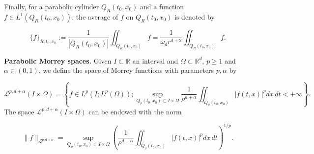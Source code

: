 \documentclass[reqno,12pt,twoside]{amsart}
\newtheorem{definition}{Definition}[section]
\numberwithin{equation}{section} \numberwithin{theorem}{section}
\numberwithin{proposition}{section} \numberwithin{lemma}{section}
\numberwithin{corollary}{section}
\numberwithin{definition}{section} \numberwithin{remark}{section}
\begin{document}
\smallskip

Finally, for a parabolic cylinder $Q_R(t_0,x_0)$ and a function $f\in L^1(Q_R(t_0,x_0))$, the average of $f$ on $Q_R(t_0,x_0)$ is denoted by 

\[\{f\}_{R, t_0,x_0} := \frac{1}{|Q_R(t_0,x_0)|} \iint_{Q_R(t_0,x_0)} f = \frac{1}{\omega_d r^{d+2}} \iint_{Q_R(t_0,x_0)} f.\]

\medskip

%
%
%
%
%
%
%
%

\textbf{Parabolic Morrey spaces.}
Given $I \subset \mathbb{R}$ an interval and $\Omega \subset \mathbb{R}^d$, $p\geqslant 1$ and $\alpha \in (0,1)$, we define the space of Morrey functions with parameters $p, \alpha$ by 

\[\mathcal{L}^{p,d +\alpha} (I \times \Omega) = \left\{ f\in L^p(I ; L^p(\Omega)) ; \sup_{Q_\rho(t_0,x_0) \subset I \times \Omega} \frac{1}{\rho^{d+\alpha}}\iint_{Q_\rho(t_0,x_0)} |f(t,x)|^p dx\, dt < +\infty\right\}.\]
The space $\mathcal{L}^{p,d +\alpha} (I \times \Omega)$ can be endowed with the norm 

\[\|f\|_{\mathcal{L}^{p,d+\alpha}} = \sup_{Q_\rho(t_0,x_0) \subset I \times \Omega} \left(\frac{1}{\rho^{d+\alpha}}\iint_{Q_\rho(t_0,x_0)} |f(t,x)|^p dx\, dt\right)^{1/p}.\]
\end{document}
